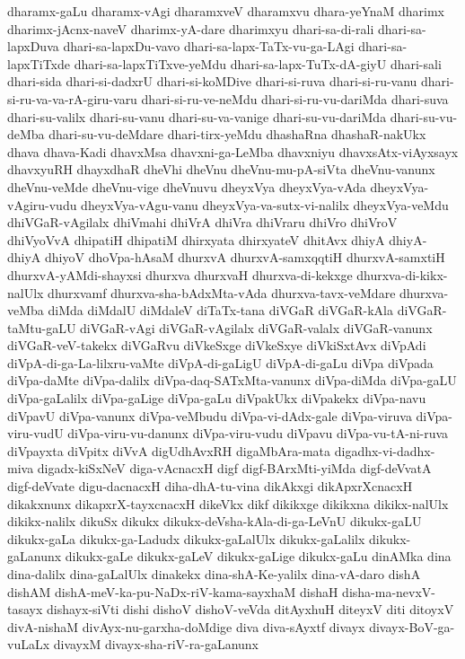 {dharamx-gaLu
dharamx-vAgi
dharamxveV
dharamxvu
dhara-yeYnaM
dharimx
dharimx-jAcnx-naveV
dharimx-yA-dare
dharimxyu
dhari-sa-di-rali
dhari-sa-lapxDuva
dhari-sa-lapxDu-vavo
dhari-sa-lapx-TaTx-vu-ga-LAgi
dhari-sa-lapxTiTxde
dhari-sa-lapxTiTxve-yeMdu
dhari-sa-lapx-TuTx-dA-giyU
dhari-sali
dhari-sida
dhari-si-dadxrU
dhari-si-koMDive
dhari-si-ruva
dhari-si-ru-vanu
dhari-si-ru-va-va-rA-giru-varu
dhari-si-ru-ve-neMdu
dhari-si-ru-vu-dariMda
dhari-suva
dhari-su-valilx
dhari-su-vanu
dhari-su-va-vanige
dhari-su-vu-dariMda
dhari-su-vu-deMba
dhari-su-vu-deMdare
dhari-tirx-yeMdu
dhashaRna
dhashaR-nakUkx
dhava
dhava-Kadi
dhavxMsa
dhavxni-ga-LeMba
dhavxniyu
dhavxsAtx-viAyxsayx
dhavxyuRH
dhayxdhaR
dheVhi
dheVnu
dheVnu-mu-pA-siVta
dheVnu-vanunx
dheVnu-veMde
dheVnu-vige
dheVnuvu
dheyxVya
dheyxVya-vAda
dheyxVya-vAgiru-vudu
dheyxVya-vAgu-vanu
dheyxVya-va-sutx-vi-nalilx
dheyxVya-veMdu
dhiVGaR-vAgilalx
dhiVmahi
dhiVrA
dhiVra
dhiVraru
dhiVro
dhiVroV
dhiVyoVvA
dhipatiH
dhipatiM
dhirxyata
dhirxyateV
dhitAvx
dhiyA
dhiyA-dhiyA
dhiyoV
dhoVpa-hAsaM
dhurxvA
dhurxvA-samxqqtiH
dhurxvA-samxtiH
dhurxvA-yAMdi-shayxsi
dhurxva
dhurxvaH
dhurxva-di-kekxge
dhurxva-di-kikx-nalUlx
dhurxvamf
dhurxva-sha-bAdxMta-vAda
dhurxva-tavx-veMdare
dhurxva-veMba
diMda
diMdalU
diMdaleV
diTaTx-tana
diVGaR
diVGaR-kAla
diVGaR-taMtu-gaLU
diVGaR-vAgi
diVGaR-vAgilalx
diVGaR-valalx
diVGaR-vanunx
diVGaR-veV-takekx
diVGaRvu
diVkeSxge
diVkeSxye
diVkiSxtAvx
diVpAdi
diVpA-di-ga-La-lilxru-vaMte
diVpA-di-gaLigU
diVpA-di-gaLu
diVpa
diVpada
diVpa-daMte
diVpa-dalilx
diVpa-daq-SATxMta-vanunx
diVpa-diMda
diVpa-gaLU
diVpa-gaLalilx
diVpa-gaLige
diVpa-gaLu
diVpakUkx
diVpakekx
diVpa-navu
diVpavU
diVpa-vanunx
diVpa-veMbudu
diVpa-vi-dAdx-gale
diVpa-viruva
diVpa-viru-vudU
diVpa-viru-vu-danunx
diVpa-viru-vudu
diVpavu
diVpa-vu-tA-ni-ruva
diVpayxta
diVpitx
diVvA
digUdhAvxRH
digaMbAra-mata
digadhx-vi-dadhx-miva
digadx-kiSxNeV
diga-vAcnacxH
digf
digf-BArxMti-yiMda
digf-deVvatA
digf-deVvate
digu-dacnacxH
diha-dhA-tu-vina
dikAkxgi
dikApxrXcnacxH
dikakxnunx
dikapxrX-tayxcnacxH
dikeVkx
dikf
dikikxge
dikikxna
dikikx-nalUlx
dikikx-nalilx
dikuSx
dikukx
dikukx-deVsha-kAla-di-ga-LeVnU
dikukx-gaLU
dikukx-gaLa
dikukx-ga-Ladudx
dikukx-gaLalUlx
dikukx-gaLalilx
dikukx-gaLanunx
dikukx-gaLe
dikukx-gaLeV
dikukx-gaLige
dikukx-gaLu
dinAMka
dina
dina-dalilx
dina-gaLalUlx
dinakekx
dina-shA-Ke-yalilx
dina-vA-daro
dishA
dishAM
dishA-meV-ka-pu-NaDx-riV-kama-sayxhaM
dishaH
disha-ma-nevxV-tasayx
dishayx-siVti
dishi
dishoV
dishoV-veVda
ditAyxhuH
diteyxV
diti
ditoyxV
divA-nishaM
divAyx-nu-garxha-doMdige
diva
diva-sAyxtf
divayx
divayx-BoV-ga-vuLaLx
divayxM
divayx-sha-riV-ra-gaLanunx
}
